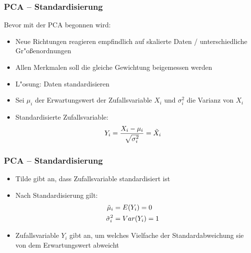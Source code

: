 \begin{frame}

\frametitle{PCA -- Standardisierung}

Bevor mit der PCA begonnen wird:

\vspace{10pt}

\begin{itemize}
\setlength{\itemsep}{6pt}
\item Neue Richtungen reagieren empfindlich auf skalierte Daten / unterschiedliche Gr"o{\ss}enordnungen
\item Allen Merkmalen soll die gleiche Gewichtung beigemessen werden
\item L"osung: Daten standardisieren
\item Sei $\mu_i$ der Erwartungswert der Zufallsvariable $X_i$ und $\sigma_i^2$ die Varianz von $X_i$
\item Standardisierte Zufallsvariable: \\
\begin{equation}
Y_i = \frac{X_i-\mu_i}{\sqrt{\sigma_i^2}} = \tilde{X}_i \notag
\end{equation}
\end{itemize}

\end{frame}







\begin{frame}

\frametitle{PCA -- Standardisierung}

\begin{itemize}
\setlength{\itemsep}{10pt}
\item Tilde gibt an, dass Zufallsvariable standardisiert ist
\item Nach Standardisierung gilt:
\begin{align}
\tilde{\mu}_i & = E(Y_i) = 0 \notag \\
\tilde{\sigma}_i^2 & = Var(Y_i) = 1 \notag  \\
\end{align}
\item Zufallsvariable $Y_i$ gibt an, um welches Vielfache der Standardabweichung sie von dem Erwartungswert abweicht
\end{itemize}

\end{frame}






